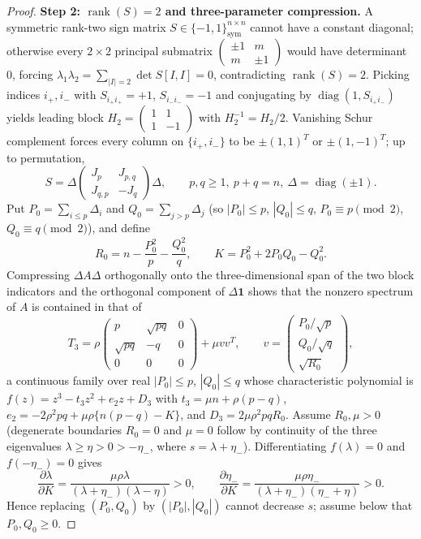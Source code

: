 \documentclass[11pt,reqno]{article}
\theoremstyle{definition}
\newcommand{\one}{\mathbf{1}}
\newcommand{\diag}{\operatorname{diag}}
\newcommand{\rank}{\operatorname{rank}}
\begin{document}
\begin{proof}
\medskip\noindent\textbf{Step 2: $\rank(S) = 2$ and three-parameter compression.}
A symmetric rank-two sign matrix $S \in \{-1, 1\}^{n \times n}_{\mathrm{sym}}$ cannot have a constant diagonal; otherwise every $2 \times 2$ principal submatrix $\begin{pmatrix} \pm 1 & m \\ m & \pm 1 \end{pmatrix}$ would have determinant $0$, forcing $\lambda_1 \lambda_2 = \sum_{|I|=2} \det S[I,I] = 0$, contradicting $\rank(S) = 2$. Picking indices $i_+, i_-$ with $S_{i_+ i_+} = +1$, $S_{i_- i_-} = -1$ and conjugating by $\diag(1, S_{i_+ i_-})$ yields leading block $H_2 = \begin{pmatrix} 1 & 1 \\ 1 & -1 \end{pmatrix}$ with $H_2^{-1} = H_2/2$. Vanishing Schur complement forces every column on $\{i_+, i_-\}$ to be $\pm(1,1)^T$ or $\pm(1,-1)^T$; up to permutation,
\[
S = \Delta \begin{pmatrix} J_p & J_{p,q} \\ J_{q,p} & -J_q \end{pmatrix} \Delta, \qquad p, q \ge 1,\ p + q = n,\ \Delta = \diag(\pm 1).
\]
Put $P_0 = \sum_{i \le p} \Delta_i$ and $Q_0 = \sum_{j > p} \Delta_j$ (so $|P_0| \le p$, $|Q_0| \le q$, $P_0 \equiv p \pmod 2$, $Q_0 \equiv q \pmod 2$), and define
\[
R_0 = n - \frac{P_0^2}{p} - \frac{Q_0^2}{q}, \qquad K = P_0^2 + 2P_0 Q_0 - Q_0^2.
\]
Compressing $\Delta A \Delta$ orthogonally onto the three-dimensional span of the two block indicators and the orthogonal component of $\Delta \one$ shows that the nonzero spectrum of $A$ is contained in that of
\begin{equation}\label{eq:app-T3}
T_3 = \rho \begin{pmatrix} p & \sqrt{pq} & 0 \\ \sqrt{pq} & -q & 0 \\ 0 & 0 & 0 \end{pmatrix} + \mu v v^T, \qquad v = \begin{pmatrix} P_0/\sqrt{p} \\ Q_0/\sqrt{q} \\ \sqrt{R_0} \end{pmatrix},
\end{equation}
a continuous family over real $|P_0| \le p$, $|Q_0| \le q$ whose characteristic polynomial is $f(z) = z^3 - t_3 z^2 + e_2 z + D_3$ with $t_3 = \mu n + \rho(p - q)$, $e_2 = -2\rho^2 pq + \mu\rho\{n(p - q) - K\}$, and $D_3 = 2\mu\rho^2 pq R_0$. Assume $R_0, \mu > 0$ (degenerate boundaries $R_0 = 0$ and $\mu = 0$ follow by continuity of the three eigenvalues $\lambda \ge \eta > 0 > -\eta_-$, where $s = \lambda + \eta_-$). Differentiating $f(\lambda) = 0$ and $f(-\eta_-) = 0$ gives
\[
\frac{\partial \lambda}{\partial K} = \frac{\mu\rho \lambda}{(\lambda + \eta_-)(\lambda - \eta)} > 0, \qquad
\frac{\partial \eta_-}{\partial K} = \frac{\mu\rho \eta_-}{(\lambda + \eta_-)(\eta_- + \eta)} > 0.
\]
Hence replacing $(P_0, Q_0)$ by $(|P_0|, |Q_0|)$ cannot decrease $s$; assume below that $P_0, Q_0 \ge 0$.


\end{proof}
\end{document}
